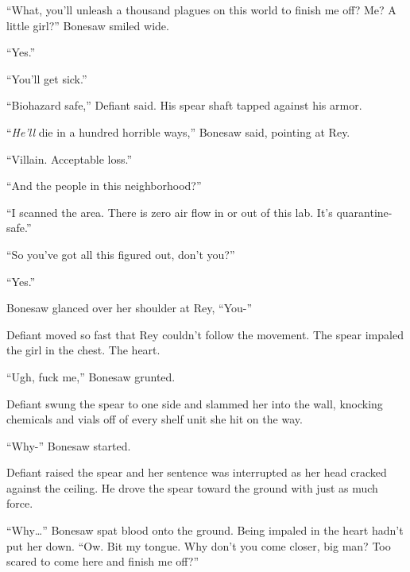 ``What, you'll unleash a thousand plagues on this world to finish me off?  Me?  A little girl?''  Bonesaw smiled wide.



``Yes.''



``You'll get sick.''



``Biohazard safe,'' Defiant said.  His spear shaft tapped against his armor.



``\emph{He'll} die in a hundred horrible ways,'' Bonesaw said, pointing at Rey.



``Villain.  Acceptable loss.''



``And the people in this neighborhood?''



``I scanned the area.  There is zero air flow in or out of this lab.  It's quarantine-safe.''



``So you've got all this figured out, don't you?''



``Yes.''



Bonesaw glanced over her shoulder at Rey, ``You-''



Defiant moved so fast that Rey couldn't follow the movement.  The spear impaled the girl in the chest.  The heart.



``Ugh, fuck me,'' Bonesaw grunted.



Defiant swung the spear to one side and slammed her into the wall, knocking chemicals and vials off of every shelf unit she hit on the way.



``Why-'' Bonesaw started.



Defiant raised the spear and her sentence was interrupted as her head cracked against the ceiling.  He drove the spear toward the ground with just as much force.



``Why\ldots'' Bonesaw spat blood onto the ground.  Being impaled in the heart hadn't put her down.  ``Ow.  Bit my tongue.  Why don't you come closer, big man?  Too scared to come here and finish me off?''



